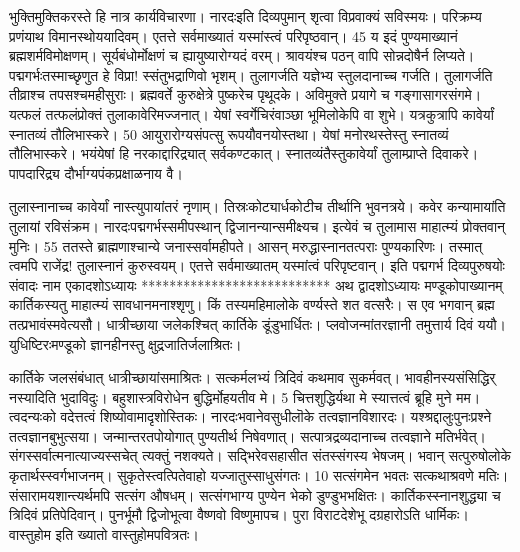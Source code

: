 भुक्तिमुक्तिकरस्ते हि नात्र कार्यविचारणा।
 नारदःइति दिव्यपुमान् शृत्वा विप्रवाक्यं सविस्मयः।
 परिक्रम्य प्रणंयाथ विमानस्थोययादिवम्।
 एतत्ते सर्वमाख्यातं यस्मांस्त्वं परिपृष्ठवान्।
 45 य इदं पुण्यमाख्यानं ब्रह्मशर्मविमोक्षणम्।
 सूर्यबंधोर्मोक्षणं च ह्यायुष्यारोग्यदं वरम्।
 श्रावयंश्च पठन् वापि सोन्नदोषैर्न लिप्यते।
 पद्मगर्भःतस्माच्छृणुत हे विप्रा! स्संतुभद्राणिवो भृशम्।
 तुलागर्जति यज्ञेभ्य स्तुलदानाच्च गर्जति।
 तुलागर्जति तीव्राश्च तपसश्चमहीसुराः।
 ब्रह्मवर्ते कुरुक्षेत्रे पुष्करेच पृथूदके।
 अविमुक्ते प्रयागे च गङ्गासागरसंगमे।
 यत्फलं तत्फलंप्रोक्तं तुलाकावेरिमज्जनात्।
 येषां स्वर्गेचिरंवाञ्छा भूमिलोकेपि वा शुभे।
 यत्रकुत्रापि कावेर्यां स्नातव्यं तौलिभास्करे।
 50 आयुरारोग्यसंपत्सु रूपयौवनयोस्तथा।
 येषां मनोरथस्तेस्तु स्नातव्यं तौलिभास्करे।
 भयंयेषां हि नरकाद्दारिद्र्यात् सर्वकण्टकात्।
 स्नातव्यंतैस्तुकावेर्यां तुलाम्प्राप्ते दिवाकरे।
 पापदारिद्र्य दौर्भाग्यपंकप्रक्षाळनाय वै।
 
तुलास्नानाच्च कावेर्यां नास्त्युपायांतरं नृणाम्।
 तिस्रःकोट्यार्धकोटीच तीर्थानि भुवनत्रये।
 कवेर कन्यामायांति तुलायां रविसंक्रम।
 नारदःपद्मगर्भस्समीपस्थान् द्विजानन्यान्समीक्ष्यच।
 इत्येवं च तुलामास माहात्म्यं प्रोक्तवान् मुनिः।
 55 ततस्ते ब्राह्मणाश्चान्ये जनास्सर्वामहीपते।
 आसन् मरुद्धास्नानतत्पराः पुण्यकारिणः।
 तस्मात् त्वमपि राजेंद्र! तुलास्नानं कुरुस्वयम्।
 एतत्ते सर्वमाख्यातम् यस्मांत्वं परिपृष्टवान्।
 इति पद्मगर्भ दिव्यपुरुषयोः संवादः नाम
एकादशोऽध्यायः
***************************
अथ द्वादशोऽध्यायः
मण्डूकोपाख्यानम् कार्तिकस्यतु माहात्म्यं सावधानमनाश्शृणु।
 किं तस्यमहिमालोके वर्ण्यस्ते शत वत्सरैः।
 स एव भगवान् ब्रह्म तत्प्रभावंस्मवेत्यसौ।
 धात्रीच्छाया जलेकश्चित् कार्तिके डूंडुभार्धितः।
 प्लवोजन्मांतरज्ञानी तमुत्तार्य दिवं ययौ।
 युधिष्टिरःमण्डूको ज्ञानहीनस्तु क्षुद्रजातिर्जलाश्रितः।
 
कार्तिके जलसंबंधात् धात्रीच्छायांसमाश्रितः।
 सत्कर्मलभ्यं त्रिदिवं कथमाव सुकर्मवत्।
 भावहीनस्यसंसिद्धिर् नस्यादिति भुदाविदुः।
 बहुशास्त्रविरोधेन बुद्धिर्मोहयतीव मे।
 5 चित्तशुद्धिर्यथा मे स्यात्तत्वं ब्रूहि मुने मम।
 त्वदन्यःको वदेत्तत्वं शिष्योवामादृशोस्तिकः।
 नारदःभवानेवसुधीलॊके तत्वज्ञानविशारदः।
 यश्श्रद्दालुःपुनःप्रश्ने तत्वज्ञानबुभुत्सया।
 जन्मान्तरतपोयोगात् पुण्यतीर्थ निषेवणात्।
 सत्पात्रद्रव्यदानाच्च तत्वज्ञाने मतिर्भवेत्।
 संगस्सर्वात्मनात्याज्यस्सचेत् त्यक्तुं नशक्यते।
 सद्भिरेवसहासीत संतस्संगस्य भेषजम्।
 भवान् सत्पुरुषोलोके कृतार्थस्स्वर्गभाजनम्।
 सुकृतेस्त्वत्पितेवाहो यज्जातुस्साधुसंगतः।
 10 सत्संगमेन भवतः सत्कथाश्रवणे मतिः।
 संसारामयशान्त्यर्थमपि सत्संग औषधम्।
 सत्संगभाग्य पुण्येन भेको डुण्डुभभक्षितः।
 कार्तिकस्स्नानशुद्ध्या च त्रिदिवं प्रतिपेदिवान्।
 पुनर्भूमौ द्विजोभूत्वा वैष्णवो विष्णुमापच।
 पुरा विराटदेशेभू दग्रहारोऽति धार्मिकः।
 वास्तुहोम इति ख्यातो वास्तुहोमपवित्रतः।
 

